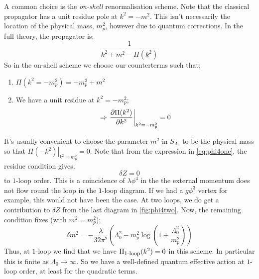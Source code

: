 \paraskip
A common choice is the \emph{on-shell} renormalisation scheme. Note that the classical propagator has a unit residue pole at $k^2 = -m^2$. This isn't necessarily the location of the physical mass, $m^2_p$, however due to quantum corrections. In the full theory, the propagator is;
\begin{equation*}
\frac{1}{k^2 + m^2 - \Pi(k^2)}
\end{equation*}
So in the on-shell scheme we choose our counterterms such that;
\begin{enumerate}
\item $\Pi(k^2 = -m^2_p) = -m^2_p+ m^2$
\item We have a unit residue at $k^2 = -m^2_p$;
\begin{equation*}
\Rightarrow \left.\frac{\del \Pi(k^2)}{\del k^2}\right|_{k^2 = -m^2_p} = 0
\end{equation*}
\end{enumerate}
It's usually convenient to choose the parameter $m^2$ in $S_{\Lambda_0}$ to be the physical mass so that $\left.\Pi(-k^2)\right|_{k^2 = m^2_p} = 0$. Note that from the expression in \eqref{eq:phi4one}, the residue condition gives;
\begin{equation}
\delta Z = 0
\end{equation}
to $1$-loop order. This is a coincidence of $\lambda \phi^4$ in the the external momentum does not flow round the loop in the $1$-loop diagram. If we had a $g\phi^3$ vertex for example, this would not have been the case. At two loops, we do get a contribution to $\delta Z$ from the last diagram in \autoref{fig:phi4two}. Now, the remaining condition fixes (with $m^2 = m^2_p$);
\begin{equation}
\delta m^2 = -\frac{\lambda}{32\pi^2}\left(\Lambda_0^2 - m^2_p \log \left(1 + \frac{\Lambda_0^2}{m^2_p}\right)\right)
\end{equation}
Thus, at $1$-loop we find that we have $\Pi_{\text{\footnotesize{1-loop}}}(k^2) = 0$ in this scheme. In particular this is finite as $\Lambda_0 \rightarrow \infty$. So we have a well-defined quantum effective action at $1$-loop order, at least for the quadratic terms.
